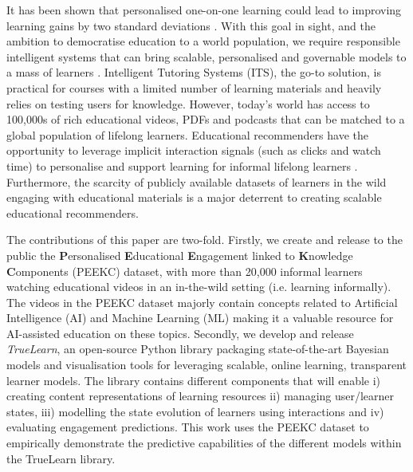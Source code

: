 \documentclass[letterpaper]{article} %
\begin{document}
It has been shown that personalised one-on-one learning could lead to improving learning gains by two standard deviations \cite{Bloom84}. 
With this goal in sight, and the ambition to democratise education to a world population, 
we require responsible intelligent systems that can bring scalable, personalised and governable models to a mass of learners \cite{democratise2021}.
Intelligent Tutoring Systems (ITS), the go-to solution, is practical for courses with a limited number of learning materials and heavily relies on testing users for knowledge. However, today's world has access to 100,000s of rich educational videos, PDFs and podcasts that can be matched to a global population of lifelong learners. 
Educational recommenders have the opportunity to 
leverage implicit interaction signals (such as clicks and watch time) to personalise and support learning for informal lifelong learners \cite{bulathwela2022sus}. Furthermore, {the scarcity of publicly available datasets of learners in the wild engaging with educational materials} is a major deterrent to creating scalable educational recommenders.

The contributions of this paper are two-fold. Firstly, we create and release to the public the \textbf{P}ersonalised \textbf{E}ducational \textbf{E}ngagement linked to \textbf{K}nowledge \textbf{C}omponents (PEEKC) dataset, with more than 20,000 informal learners watching educational videos in an in-the-wild setting (i.e. learning informally). The videos in the PEEKC dataset majorly contain concepts related to Artificial Intelligence (AI) and Machine Learning (ML) making it a valuable resource for AI-assisted education on these topics. Secondly, we develop and release \emph{TrueLearn},
an open-source Python library packaging state-of-the-art Bayesian models and visualisation tools for leveraging scalable, online learning, transparent learner models. The library contains different components that will enable i) creating content representations of learning resources ii) managing user/learner states, iii) modelling the state evolution of learners using interactions and iv) evaluating engagement predictions. This work uses the PEEKC dataset to empirically demonstrate the predictive capabilities of the different models within the TrueLearn library.  
\end{document}
